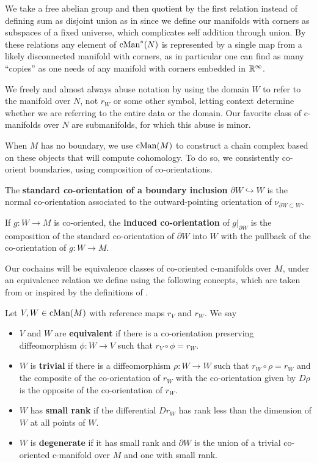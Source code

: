 We take a free abelian group and then quotient by the first relation instead of defining sum as disjoint union as in \cite{Lipy14} since we define our manifolds with corners as subspaces of a fixed universe, which complicates self addition through union.
By these relations any element of $\mathrm{cMan}^*(N)$ is represented by a single map from a likely disconnected manifold with corners, as in particular one can find as many ``copies'' as one needs of any manifold with corners embedded in $\mathbb{R}^\infty$.

We freely and almost always abuse notation by using the domain $W$ to refer to the manifold over $N$, not $r_W$ or some other symbol, letting context determine whether we are referring to the entire data or the domain.
Our favorite class of c-manifolds over $N$ are submanifolds, for which this abuse is minor.

When $M$ has no boundary, we use $\mathrm{cMan}(M)$ to construct a chain complex based on these objects that will compute cohomology.
To do so, we consistently co-orient boundaries, using composition of co-orientations.

\begin{definition}\label{D:boundary co-orientation}
	The {\bf standard co-orientation of a boundary inclusion} $\partial W \hookrightarrow W$ is the normal co-orientation associated to the outward-pointing orientation of $\nu_{\partial W \subset W}$.

	If $g \colon W \to M$ is co-oriented, the {\bf induced co-orientation} of $g|_{\partial W}$ is the composition of the standard co-orientation of $\partial W$ into $W$ with the pullback of the co-orientation of $g \colon W \to M$.
\end{definition}

Our cochains will be equivalence classes of co-oriented c-manifolds over $M$, under an equivalence relation we define using the following concepts, which are taken from or inspired by the definitions of \cite{Lipy14}.

\begin{definition}\label{D:cman types}
	Let $V, W\in \mathrm{cMan}(M)$ with reference maps $r_V$ and $r_W$.
	We say
	\begin{itemize}
		\item $V$ and $W$ are \textbf{equivalent} if there is a co-orientation preserving diffeomorphism $\phi \colon W \to V$ such that $r_V \circ \phi = r_W$.
		\item $W$ is \textbf{trivial} if there is a diffeomorphism $\rho \colon W \to W$ such that $r_W \circ \rho = r_W$
		and the composite of the co-orientation of $r_W$ with the co-orientation given by $D\rho$ is the opposite of the co-orientation of $r_W$.
		\item $W$ has \textbf{small rank} if the differential $D r_W$ has rank less than the dimension of $W$ at all points of $W$.
		\item $W$ is \textbf{degenerate} if it has small rank and ${\partial W}$ is the union of a trivial co-oriented
		c-manifold over $M$ and one with small rank.
	\end{itemize}
\end{definition}

